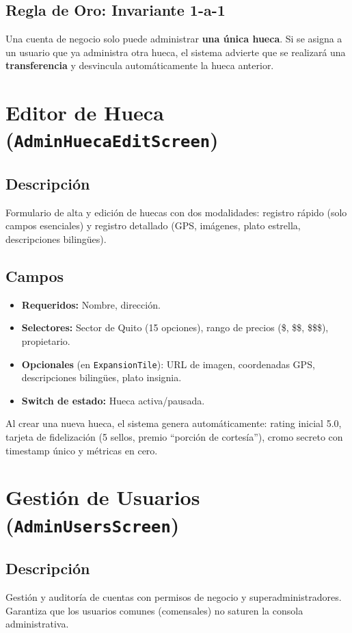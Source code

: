 \documentclass[11pt, a4paper, oneside]{report}
\begin{document}
\subsection{Regla de Oro: Invariante 1-a-1}
Una cuenta de negocio solo puede administrar \textbf{una única hueca}. Si se asigna a un usuario que ya administra otra hueca, el sistema advierte que se realizará una \textbf{transferencia} y desvincula automáticamente la hueca anterior.

\section{Editor de Hueca (\texttt{AdminHuecaEditScreen})}

\subsection{Descripción}
Formulario de alta y edición de huecas con dos modalidades: registro rápido (solo campos esenciales) y registro detallado (GPS, imágenes, plato estrella, descripciones bilingües).

\subsection{Campos}
\begin{itemize}
  \item \textbf{Requeridos:} Nombre, dirección.
  \item \textbf{Selectores:} Sector de Quito (15 opciones), rango de precios (\$, \$\$, \$\$\$), propietario.
  \item \textbf{Opcionales} (en \texttt{ExpansionTile}): URL de imagen, coordenadas GPS, descripciones bilingües, plato insignia.
  \item \textbf{Switch de estado:} Hueca activa/pausada.
\end{itemize}

Al crear una nueva hueca, el sistema genera automáticamente: rating inicial 5.0, tarjeta de fidelización (5 sellos, premio ``porción de cortesía''), cromo secreto con timestamp único y métricas en cero.

\section{Gestión de Usuarios (\texttt{AdminUsersScreen})}

\subsection{Descripción}
Gestión y auditoría de cuentas con permisos de negocio y superadministradores. Garantiza que los usuarios comunes (comensales) no saturen la consola administrativa.
\end{document}
